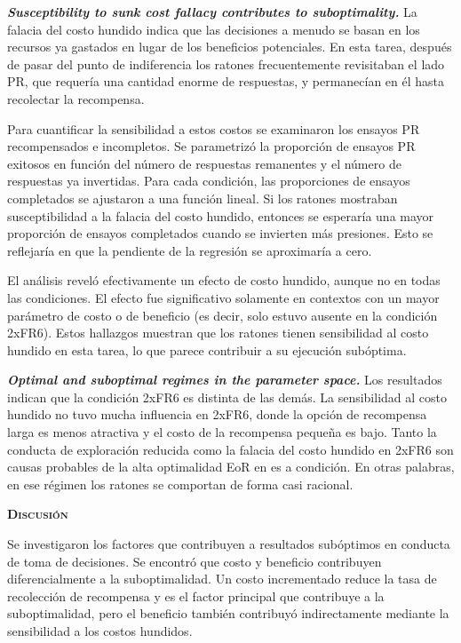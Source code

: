 \documentclass[a4paper,12pt]{article}
\begin{document}
{\itshape\bfseries Susceptibility to sunk cost fallacy contributes to suboptimality.} La falacia del costo hundido indica que las decisiones a menudo se basan en los recursos ya gastados en lugar de los beneficios potenciales. En esta tarea, después de pasar del punto de indiferencia los ratones frecuentemente revisitaban el lado PR, que requería una cantidad enorme de respuestas, y permanecían en él hasta recolectar la recompensa.

Para cuantificar la sensibilidad a estos costos se examinaron los ensayos PR recompensados e incompletos. Se parametrizó la proporción de ensayos PR exitosos en función del número de respuestas remanentes y el número de respuestas ya invertidas. Para cada condición, las proporciones de ensayos completados se ajustaron a una función lineal. Si los ratones mostraban susceptibilidad a la falacia del costo hundido, entonces se esperaría una mayor proporción de ensayos completados cuando se invierten más presiones. Esto se reflejaría en que la pendiente de la regresión se aproximaría a cero.

El análisis reveló efectivamente un efecto de costo hundido, aunque no en todas las condiciones. El efecto fue significativo solamente en contextos con un mayor parámetro de costo o de beneficio (es decir, solo estuvo ausente en la condición 2xFR6). Estos hallazgos muestran que los ratones tienen sensibilidad al costo hundido en esta tarea, lo que parece contribuir a su ejecución subóptima.

{\itshape\bfseries Optimal and suboptimal regimes in the parameter space.} Los resultados indican que la condición 2xFR6 es distinta de las demás. La sensibilidad al costo hundido no tuvo mucha influencia en 2xFR6, donde la opción de recompensa larga es menos atractiva y el costo de la recompensa pequeña es bajo. Tanto la conducta de exploración reducida como la falacia del costo hundido en 2xFR6 son causas probables de la alta optimalidad EoR en es a condición. En otras palabras, en ese régimen los ratones se comportan de forma casi racional.

{\scshape\bfseries Discusión}

Se investigaron los factores que contribuyen a resultados subóptimos en conducta de toma de decisiones. Se encontró que costo y beneficio contribuyen diferencialmente a la suboptimalidad. Un costo incrementado reduce la tasa de recolección de recompensa y es el factor principal que contribuye a la suboptimalidad, pero el beneficio también contribuyó indirectamente mediante la sensibilidad a los costos hundidos. 
\end{document}
